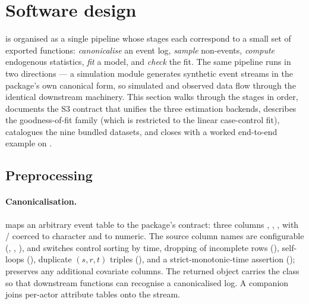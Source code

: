 \section{Software design}
\label{sec:software}

 is organised as a single pipeline whose stages each correspond to a
small set of exported functions: \emph{canonicalise} an event log,
\emph{sample} non-events, \emph{compute} endogenous statistics, \emph{fit} a
model, and \emph{check} the fit. The same pipeline runs in two directions --- a
simulation module generates synthetic event streams in the package's own
canonical form, so simulated and observed data flow through the identical
downstream machinery. This section walks through the stages in order, documents
the  S3 contract that unifies the three estimation backends, describes
the goodness-of-fit family (which is restricted to the linear case-control fit),
catalogues the nine bundled datasets, and closes with a worked end-to-end
example on .

\subsection{Preprocessing}
\label{sec:software-preprocess}

\paragraph{Canonicalisation.}
 maps an arbitrary event table to the package's
 contract: three columns , ,
, with / coerced to character and
 to numeric. The source column names are configurable
(, , ), and switches
control sorting by time, dropping of incomplete rows (),
self-loops (), duplicate \((s,r,t)\) triples
(), and a strict-monotonic-time assertion
();  preserves any additional
covariate columns. The returned object carries the 
class so that downstream functions can recognise a canonicalised log. A
companion  joins per-actor attribute tables
onto the stream.

